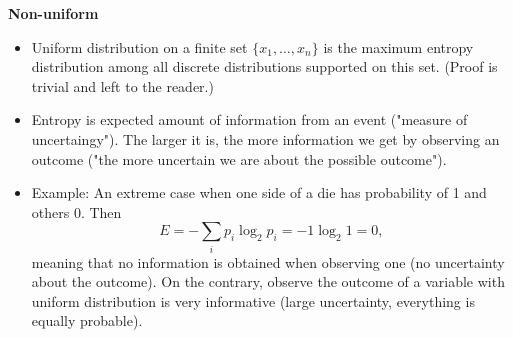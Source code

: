 \documentclass{beamer}
\begin{document}
\begin{frame}
\textbf{Non-uniform}
\begin{itemize}
\item Uniform distribution on a finite set $\{x_1, \dots, x_n \}$ is the maximum entropy distribution among all discrete distributions supported on this set. (Proof is trivial and left to the reader.)
\item Entropy is expected amount of information from an event ("measure of uncertaingy"). The larger it is, the more information we get by observing an outcome ("the more uncertain we are about the possible outcome").
\item Example: An extreme case when one side of a die has probability of 1 and others 0. Then $$E = -\sum\limits_i p_i \log_2 p_i = - 1\log_2 1 = 0, $$ meaning that no information is obtained when observing one (no uncertainty about the outcome). On the contrary, observe the outcome of a variable with uniform distribution is very informative (large uncertainty, everything is equally probable).
\end{itemize}
\end{frame}
\end{document}
